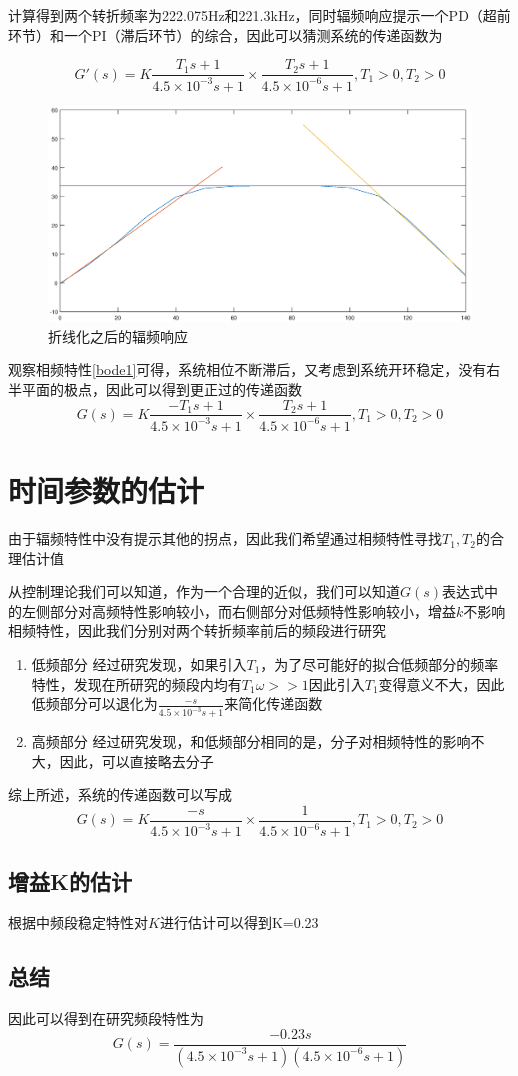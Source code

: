 \documentclass[UTF8,a4paper]{ctexart}
\begin{document}
计算得到两个转折频率为222.075Hz和221.3kHz，同时辐频响应提示一个PD（超前环节）和一个PI（滞后环节）的综合，因此可以猜测系统的传递函数为

\begin{equation}
G'(s)=K\frac{T_1s+1}{4.5\times10^{-3}s+1}\times\frac{T_2s+1}{4.5\times10^{-6}s+1}, T_1>0,T_2>0
\end{equation}
\begin{figure}
\includegraphics[width=\textwidth]{bode1.eps}
\caption{折线化之后的辐频响应}
\label{refin1}
\end{figure}
观察相频特性\ref{bode1}可得，系统相位不断滞后，又考虑到系统开环稳定，没有右半平面的极点，因此可以得到更正过的传递函数
\begin{equation}
G(s)=K\frac{-T_1s+1}{4.5\times10^{-3}s+1}\times\frac{T_2s+1}{4.5\times10^{-6}s+1}, T_1>0,T_2>0
\end{equation}
\section{时间参数的估计}
由于辐频特性中没有提示其他的拐点，因此我们希望通过相频特性寻找$T_1,T_2$的合理估计值

从控制理论我们可以知道，作为一个合理的近似，我们可以知道$G(s)$表达式中的左侧部分对高频特性影响较小，而右侧部分对低频特性影响较小，增益$k$不影响相频特性，因此我们分别对两个转折频率前后的频段进行研究

\begin{enumerate}
\item{低频部分}
经过研究发现，如果引入$T_1$，为了尽可能好的拟合低频部分的频率特性，发现在所研究的频段内均有$T_1\omega >> 1 $因此引入$T_1$变得意义不大，因此低频部分可以退化为$\frac{-s}{4.5\times10^{-3}s+1}$来简化传递函数
\item{高频部分}
经过研究发现，和低频部分相同的是，分子对相频特性的影响不大，因此，可以直接略去分子
\end{enumerate}
综上所述，系统的传递函数可以写成
\begin{equation}
G(s)=K\frac{-s}{4.5\times10^{-3}s+1}\times\frac{1}{4.5\times10^{-6}s+1}, T_1>0,T_2>0
\end{equation}

\subsection{增益K的估计}
根据中频段稳定特性对$K$进行估计可以得到K=0.23
\subsection{总结}
因此可以得到在研究频段特性为
\begin{equation}
G(s)=\frac{-0.23s}{(4.5\times10^{-3}s+1)(4.5\times10^{-6}s+1)}
\end{equation}
\end{document}
